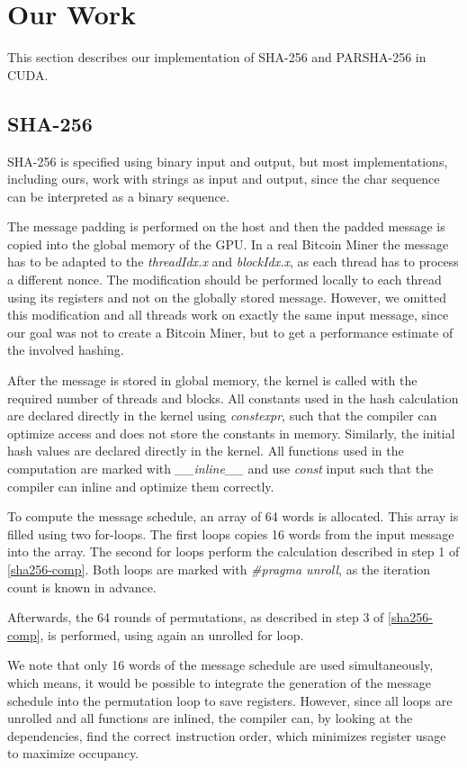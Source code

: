\documentclass[letterpaper]{article}
\begin{document}
\section{Our Work}\label{sec:yourmethod}

This section describes our implementation of SHA-256 and PARSHA-256 in CUDA.

\subsection{SHA-256}
SHA-256 is specified using binary input and output, but most implementations, including ours, work with strings as input and output, since the char sequence can be interpreted as a binary sequence. 

The message padding is performed on the host and then the padded message is copied into the global memory of the GPU. In a real Bitcoin Miner the message has to be adapted to the \emph{threadIdx.x} and \emph{blockIdx.x}, as each thread has to process a different nonce. The modification should be performed locally to each thread using its registers and not on the globally stored message. However, we omitted this modification and all threads work on exactly the same input message, since our goal was not to create a Bitcoin Miner, but to get a performance estimate of the involved hashing.

After the message is stored in global memory, the kernel is called with the required number of threads and blocks.
All constants used in the hash calculation are declared directly in the kernel using \emph{constexpr}, such that the compiler can optimize access and does not store the constants in memory. Similarly, the initial hash values are declared directly in the kernel. All functions used in the computation are marked with \emph{\_\_inline\_\_} and use \emph{const} input such that the compiler can inline and optimize them correctly.

To compute the message schedule, an array of 64 words is allocated. This array is filled using two for-loops. The first loops copies 16 words from the input message into the array. The second for loops perform the calculation described in step 1 of \ref{sha256-comp}. Both loops are marked with \emph{\#pragma unroll}, as the iteration count is known in advance. 

Afterwards, the 64 rounds of permutations, as described in step 3 of \ref{sha256-comp}, is performed, using again an unrolled for loop.

We note that only 16 words of the message schedule are used simultaneously, which means, it would be possible to integrate the generation of the message schedule into the permutation loop to save registers. However, since all loops are unrolled and all functions are inlined, the compiler can, by looking at the dependencies, find the correct instruction order, which minimizes register usage to maximize occupancy. 
\end{document}
